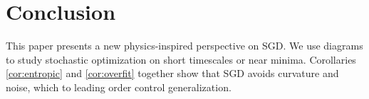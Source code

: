 \documentclass[anon,12pt]{colt2021} %
\newcommand{\ofsix}[1]{
    {\tiny \raisebox{0.04cm}{$\substack{
        \ifthenelse{\equal{#1}{0}}{{\color{moor}\blacksquare}}{\square}
        \ifthenelse{\equal{#1}{2}}{{\color{moor}\blacksquare}}{\square}    
        \ifthenelse{\equal{#1}{4}}{{\color{moor}\blacksquare}}{\square} \\
        \ifthenelse{\equal{#1}{1}}{{\color{moor}\blacksquare}}{\square}    
        \ifthenelse{\equal{#1}{3}}{{\color{moor}\blacksquare}}{\square}
        \ifthenelse{\equal{#1}{5}}{{\color{moor}\blacksquare}}{\square}
    }$}}%
}
\newcommand{\MeanEstimation}{\textsc{Mean Estimation}}
\begin{document}
{        %
    
            
    \section{Conclusion}



            This paper presents a new physics-inspired perspective on SGD.  We
            use diagrams to study stochastic optimization on short timescales
            or near minima.  Corollaries \ref{cor:entropic} and
            \ref{cor:overfit} together show that SGD avoids curvature and
            noise, which to leading order control generalization.

}
\end{document}
